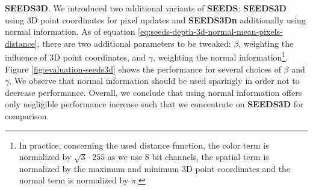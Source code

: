 \textbf{SEEDS3D}. We introduced two additional variants of \textbf{SEEDS}: \textbf{SEEDS3D} using 3D point coordinates for pixel updates and \textbf{SEEDS3Dn} additionally using normal information. As of equation \eqref{eq:seeds-depth-3d-normal-mean-pixels-distance}, there are two additional parameters to be tweaked: $\beta$, weighting the influence of 3D point coordinates, and $\gamma$, weighting the normal information\footnote{In practice, concerning the used distance function, the color term is normalized by $\sqrt{3} \cdot 255$ as we use $8$ bit channels, the spatial term is normalized by the maximum and minimum 3D point coordinates and the normal term is normalized by $\pi$.}. Figure \ref{fig:evaluation-seeds3d} shows the performance for several choices of $\beta$ and $\gamma$. We observe that normal information should be used sparingly in order not to decrease performance. Overall, we conclude that using normal information offers only negligible performance increase such that we concentrate on \textbf{SEEDS3D} for comparison.%
